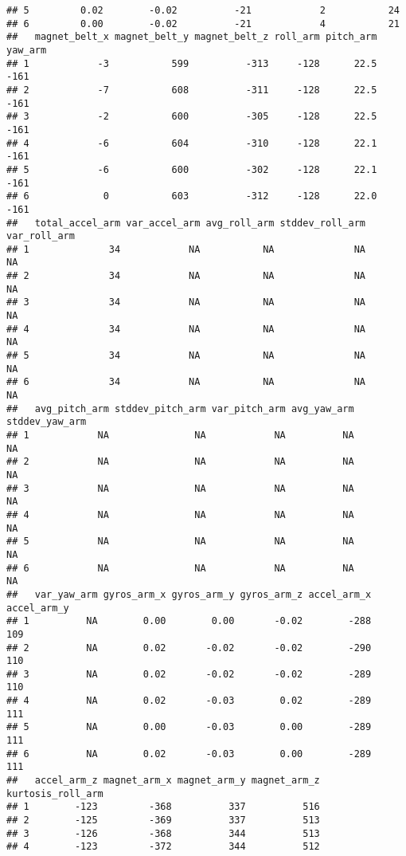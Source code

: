 \documentclass[]{article}
\begin{document}
\begin{verbatim}
## 5         0.02        -0.02          -21            2           24
## 6         0.00        -0.02          -21            4           21
##   magnet_belt_x magnet_belt_y magnet_belt_z roll_arm pitch_arm yaw_arm
## 1            -3           599          -313     -128      22.5    -161
## 2            -7           608          -311     -128      22.5    -161
## 3            -2           600          -305     -128      22.5    -161
## 4            -6           604          -310     -128      22.1    -161
## 5            -6           600          -302     -128      22.1    -161
## 6             0           603          -312     -128      22.0    -161
##   total_accel_arm var_accel_arm avg_roll_arm stddev_roll_arm var_roll_arm
## 1              34            NA           NA              NA           NA
## 2              34            NA           NA              NA           NA
## 3              34            NA           NA              NA           NA
## 4              34            NA           NA              NA           NA
## 5              34            NA           NA              NA           NA
## 6              34            NA           NA              NA           NA
##   avg_pitch_arm stddev_pitch_arm var_pitch_arm avg_yaw_arm stddev_yaw_arm
## 1            NA               NA            NA          NA             NA
## 2            NA               NA            NA          NA             NA
## 3            NA               NA            NA          NA             NA
## 4            NA               NA            NA          NA             NA
## 5            NA               NA            NA          NA             NA
## 6            NA               NA            NA          NA             NA
##   var_yaw_arm gyros_arm_x gyros_arm_y gyros_arm_z accel_arm_x accel_arm_y
## 1          NA        0.00        0.00       -0.02        -288         109
## 2          NA        0.02       -0.02       -0.02        -290         110
## 3          NA        0.02       -0.02       -0.02        -289         110
## 4          NA        0.02       -0.03        0.02        -289         111
## 5          NA        0.00       -0.03        0.00        -289         111
## 6          NA        0.02       -0.03        0.00        -289         111
##   accel_arm_z magnet_arm_x magnet_arm_y magnet_arm_z kurtosis_roll_arm
## 1        -123         -368          337          516                  
## 2        -125         -369          337          513                  
## 3        -126         -368          344          513                  
## 4        -123         -372          344          512                  

\end{verbatim}
\end{document}

